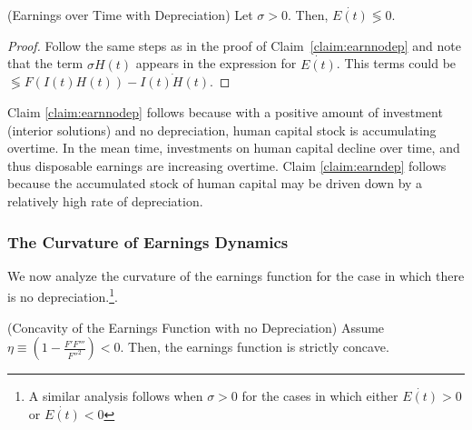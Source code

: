 \begin{claim} (Earnings over Time with Depreciation) \label{claim:earndep}
Let $\sigma > 0$. Then, $\dot{E(t)} \lessgtr 0$. 
\end{claim}

\begin{proof}
Follow the same steps as in the proof of Claim~\ref{claim:earnnodep} and note that the term $\sigma H(t)$ appears in the expression for $\dot{E(t)}$. This terms could be $\lessgtr F \left( I(t) H(t) \right) - \dot{I(t)H(t)} $.
\end{proof}

\indent Claim \ref{claim:earnnodep} follows because with a positive amount of investment (interior solutions) and no depreciation, human capital stock is accumulating overtime. In the mean time, investments on human capital decline over time, and thus disposable earnings are increasing overtime. Claim \ref{claim:earndep} follows because the accumulated stock of human capital may be driven down by a relatively high rate of depreciation.

\subsubsection{The Curvature of Earnings Dynamics} \label{section:egdyn}
\indent We now analyze the curvature of the earnings function for the case in which there is no depreciation.\footnote{A similar analysis follows when $\sigma>0$ for the cases in which either $\dot{E(t)}> 0$ or $\dot{E(t)}< 0$}. 

\begin{claim} (Concavity of the Earnings Function with no Depreciation)
\label{claim:concearnnodep}
Assume $\eta \equiv \left( 1 - \frac{F'F'''}{{F''}^2} \right) < 0$. Then, the earnings function is strictly concave. 
\end{claim}

